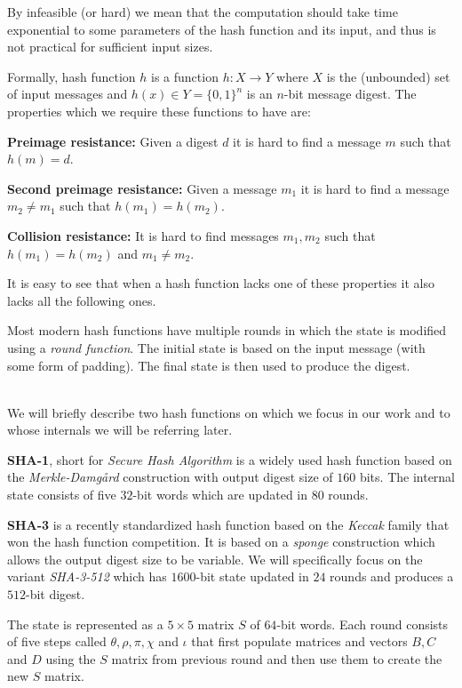 By infeasible (or hard) we mean that the computation should take time exponential to some parameters of the hash function and its input, and thus is not practical for sufficient input sizes.

Formally, hash function $h$ is a function $h: X \to Y$ where $X$ is the (unbounded) set of input messages and $h(x) \in Y = \{0,1\}^n$ is an $n$-bit message digest.
The properties which we require these functions to have are:

\textbf{Preimage resistance:} Given a digest $d$ it is hard to find a message $m$ such that $h(m) = d$.

\textbf{Second preimage resistance:} Given a message $m_1$ it is hard to find a message $m_2 \neq m_1$ such that $h(m_1) = h(m_2)$.

\textbf{Collision resistance:} It is hard to find messages $m_1,m_2$ such that $h(m_1) = h(m_2)$ and $m_1 \neq m_2$.

It is easy to see that when a hash function lacks one of these properties it also lacks all the following ones.

Most modern hash functions have multiple rounds in which the state is modified using a \emph{round function}.
The initial state is based on the input message (with some form of padding).
The final state is then used to produce the digest.

~\\

We will briefly describe two hash functions on which we focus in our work and to whose internals we will be referring later.

\textbf{SHA-1}, short for \emph{Secure Hash Algorithm} is a widely used hash function based on the \emph{Merkle-Damg\aa rd} construction with output digest size of $160$ bits.
The internal state consists of five $32$-bit words which are updated in $80$ rounds.

\textbf{SHA-3} is a recently standardized hash function based on the \emph{Keccak} family that won the hash function competition.
It is based on a \emph{sponge} construction which allows the output digest size to be variable.
We will specifically focus on the variant \emph{SHA-3-512} which has $1600$-bit state updated in $24$ rounds and produces a $512$-bit digest.

The state is represented as a $5\times 5$ matrix $S$ of $64$-bit words.
Each round consists of five steps called $\theta, \rho, \pi, \chi$ and $\iota$ that first populate matrices and vectors $B, C$ and $D$ using the $S$ matrix from previous round and then use them to create the new $S$ matrix.

